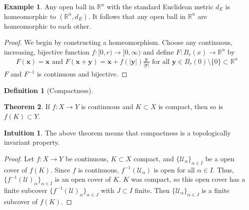 \documentclass[a4paper]{book}
\theoremstyle{definition}
\newtheorem{definition}{Definition}[]
\newtheorem{example}{Example}[definition]
\newtheorem{theorem}[definition]{Theorem}
\newtheorem*{intuition}{Intuition}
\begin{document}
\begin{exmbox}
    \begin{example}
        Any open ball in \(\mathbb{R}^n\) with the standard Euclidean metric \(d_E\) is homeomorphic to \((\mathbb{R}^n, d_E)\). It follows that any open ball in \(\mathbb{R}^n\) are homeomorphic to each other.
    \end{example}
\end{exmbox}
\begin{proof}
    We begin by constructing a homeomorphism. Choose any continuous, increasing, bijective function \(f:[0, r) \longrightarrow [0, \infty)\) and define \(F: B_r(x) \longrightarrow \mathbb{R}^n\) by
    \begin{align*}
        F(\textbf{x}) = \textbf{x} \text{ and } F(\textbf{x} + \textbf{y}) = \textbf{x} + f(|\textbf{y}|) \frac{\textbf{y}}{|\textbf{y}|} \text{ for all } \textbf{y} \in B_r(0) \setminus \{0\} \subset \mathbb{R}^n
    \end{align*}
    \(F\) and \(F^{-1}\) is continuous and bijective.
\end{proof}

\begin{defbox}
    \begin{definition}[Compactness]
        
    \end{definition}
\end{defbox}

\begin{thmbox}
    \begin{theorem}
        If \(f: X \longrightarrow Y\) is continuous and \(K \subset X\) is compact, then so is \(f(K) \subset Y\).
    \end{theorem}
\end{thmbox}
\begin{intbox}
    \begin{intuition}
        The above theorem means that compactness is a topologically invariant property.
    \end{intuition}
\end{intbox}
\begin{proof}
    Let \(f: X \longrightarrow Y\) be continuous, \(K \subset X\) compact, and \(\{\mathcal{U}_\alpha\}_{\alpha \in I}\) be a open cover of \(f(K)\). Since \(f\) is continuous, \(f^{-1}(\mathcal{U}_\alpha)\) is open for all \(\alpha \in I\). Thus, \(\{f^{-1}(\mathcal{U})_\alpha\}_{\alpha \in I}\) is an open cover of \(K\). \(K\) was compact, so this open cover has a finite subcover \(\{f^{-1}(\mathcal{U})_\alpha\}_{\alpha \in J}\) with \(J \subset I\) finite. Then \(\{\mathcal{U}_\alpha\}_{\alpha \in J}\) is a finite subcover of \(f(K)\).
\end{proof}
\end{document}
